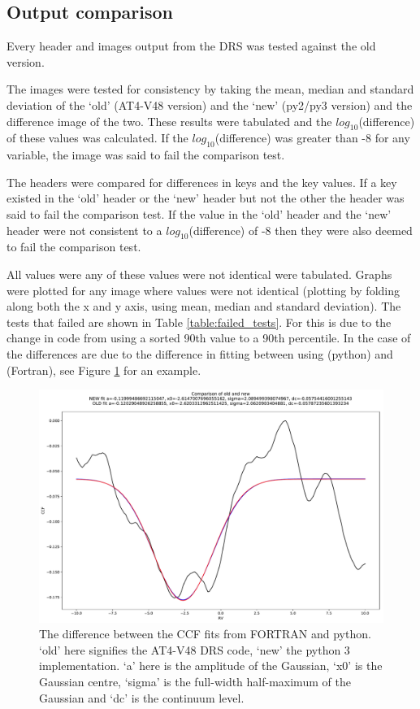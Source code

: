 \subsection{Output comparison}

Every header and images output from the DRS was tested against the old version. 

The images were tested for consistency by taking the mean, median and standard deviation of the `old' (AT4-V48 version) and the `new' (py2/py3 version) and the difference image of the two. These results were tabulated and the $log_{10}$(difference) of these values was calculated. If the $log_{10}$(difference) was greater than -8 for any variable, the image was said to fail the comparison test.

The headers were compared for differences in keys and the key values. If a key existed in the `old' header or the `new' header but not the other the header was said to fail the comparison test. If the value in the `old' header and the `new' header were not consistent to a $log_{10}$(difference) of -8 then they were also deemed to fail the comparison test.

All values were any of these values were not identical were tabulated. Graphs were plotted for any image where values were not identical (plotting by folding along both the x and y axis, using mean, median and standard deviation). The tests that failed are shown in Table \ref{table:failed_tests}.
For \calbadpix this is due to the change in code from using a sorted 90th value to a 90th percentile. In the case of \calCCF the differences are due to the difference in fitting between using  (python) and  (Fortran), see Figure \ref{figure:ccf_fitting_probelm} for an example.


\begin{figure}
\begin{center}
\includegraphics[width=.8\textwidth]{Figures/CCF_fitting_difference.pdf}
\end{center}
\caption{ The difference between the CCF fits from FORTRAN and python. `old' here signifies the AT4-V48 DRS code, `new' the python 3 implementation. `a' here is the amplitude of the Gaussian, `x0' is the Gaussian centre, `sigma' is the full-width half-maximum of the Gaussian and `dc' is the continuum level. \label{figure:ccf_fitting_probelm}}
\end{figure}

